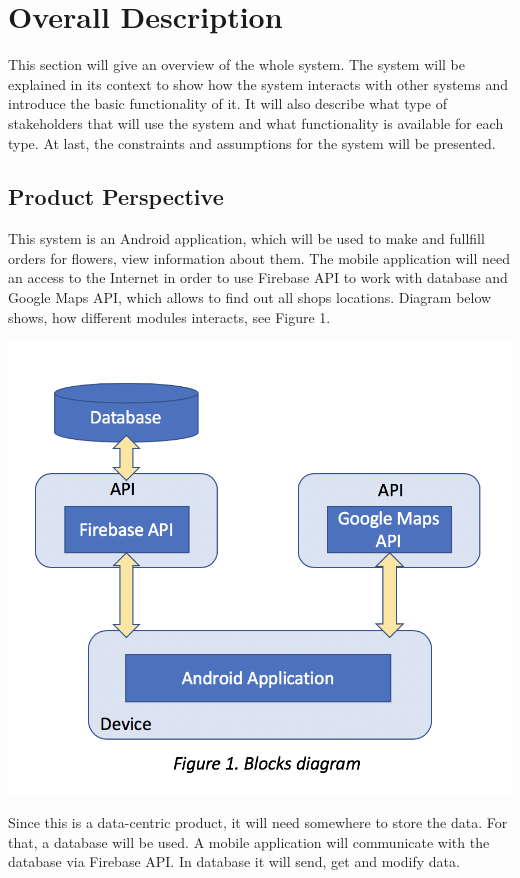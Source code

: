 \documentclass{scrreprt}
\begin{document}
\chapter{Overall Description}

This section will give an overview of the whole system. The system will be explained in its context to show how the system interacts with other systems and introduce the basic functionality of it. It will also describe what type of stakeholders that will use the system and what functionality is available for each type. At last, the constraints and assumptions for the system will be presented.

\section{Product Perspective}
This system is an Android application, which will be used to make and fullfill orders for flowers, view information about them. The mobile application will need an access to the Internet in order to use Firebase API to work with database and Google Maps API, which allows to find out all shops locations. Diagram below shows, how different modules interacts, see Figure 1.

\begin{center}
\includegraphics[scale=0.7]{blocks}
\end{center}
Since this is a data-centric product, it will need somewhere to store the data. For that, a database will be used. A mobile application will communicate with the database via Firebase API. In database it will send, get and modify data.
\end{document}
